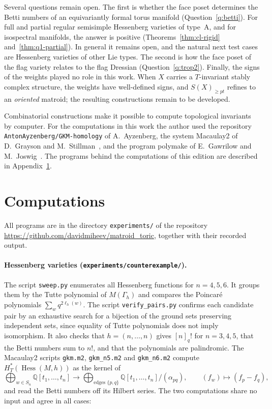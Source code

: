 \documentclass[11pt,a4paper]{article}
\numberwithin{equation}{section}
\theoremstyle{plain}
\theoremstyle{definition}
\theoremstyle{remark}
\newcommand{\Q}{\mathbb{Q}}
\newcommand{\HT}{H^{*}_{T}}
\DeclareMathOperator{\Hess}{Hess}
\begin{document}
Several questions remain open. The first is whether the face poset determines the Betti numbers of an equivariantly formal torus manifold (Question~\ref{q:betti}). For full and partial regular semisimple Hessenberg varieties of type~A, and for isospectral manifolds, the answer is positive (Theorems~\ref{thm:cl-rigid} and~\ref{thm:q1-partial}). In general it remains open, and the natural next test cases are Hessenberg varieties of other Lie types. The second is how the face poset of the flag variety relates to the flag Dressian (Question~\ref{q:trop2}). Finally, the signs of the weights played no role in this work. When $X$ carries a $T$-invariant stably complex structure, the weights have well-defined signs, and $S(X)_{\geqslant pt}$ refines to an \emph{oriented} matroid; the resulting constructions remain to be developed.

Combinatorial constructions make it possible to compute topological invariants by computer. For the computations in this work the author used the repository \nolinkurl{AntonAyzenberg/GKM-homology} of A.~Ayzenberg, the system Macaulay2 of D.~Grayson and M.~Stillman~\cite{M2}, and the program polymake of E.~Gawrilow and M.~Joswig~\cite{GJ00}. The programs behind the computations of this edition are described in Appendix~\ref{app:computations}.

\appendix
\section{Computations}\label{app:computations}

All programs are in the directory \texttt{experiments/} of the repository \url{https://github.com/davidmiheev/matroid_toric}, together with their recorded output.

\paragraph{Hessenberg varieties (\nolinkurl{experiments/counterexample/}).}
The script \texttt{sweep.py} enumerates all Hessenberg functions for $n=4,5,6$. It groups them by the Tutte polynomial of $M(\Gamma_h)$ and compares the Poincaré polynomials $\sum_wq^{2\ell_h(w)}$. The script \texttt{verify\_pairs.py} confirms each candidate pair by an exhaustive search for a bijection of the ground sets preserving independent sets, since equality of Tutte polynomials does not imply isomorphism. It also checks that $h=(n,\dots,n)$ gives $[n]_q!$ for $n=3,4,5$, that the Betti numbers sum to $n!$, and that the polynomials are palindromic. The Macaulay2 scripts \texttt{gkm.m2}, \texttt{gkm\_n5.m2} and \texttt{gkm\_n6.m2} compute $\HT(\Hess(M,h))$ as the kernel of
\[
\bigoplus_{w\in S_n}\Q[t_1,\dots,t_n]\to\bigoplus_{\text{edges }\{p,q\}}\Q[t_1,\dots,t_n]/(\alpha_{pq}),\qquad(f_w)\mapsto(f_p-f_q),
\]
and read the Betti numbers off its Hilbert series. The two computations share no input and agree in all cases:
\end{document}
